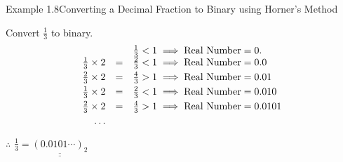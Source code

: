 \documentclass{book}
\begin{document}
\begin{egBox}{Example 1.8}{Converting a Decimal Fraction to Binary using Horner's Method}
    \raggedright
    Convert $\frac{1}{3}$ to binary.\\
    \[
    \begin{array}{rcl}
        & & \frac{1}{3} < 1 \implies \text{Real Number} = 0. \\
        \vspace{0.1cm}
        \frac{1}{3} \times 2 &=& \frac{2}{3} < 1 \implies \text{Real Number} = 0.0 \\
        \vspace{0.1cm}
        \frac{2}{3} \times 2 &=& \frac{4}{3} > 1 \implies \text{Real Number} = 0.01 \\
        \vspace{0.1cm}
        \frac{1}{3} \times 2 &=& \frac{2}{3} < 1 \implies \text{Real Number} = 0.010 \\
        \vspace{0.1cm}
        \frac{2}{3} \times 2 &=& \frac{4}{3} > 1 \implies \text{Real Number} = 0.0101 \\
        \vspace{0.1cm}
        \ldots & & \\
    \end{array}
    \]
    $\therefore$ $\frac{1}{3} = \underline{\underline{(0.0101\cdots)_2}}$
\end{egBox}
\end{document}
